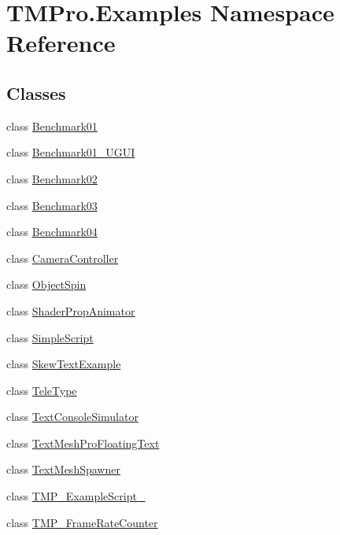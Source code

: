 \hypertarget{namespaceTMPro_1_1Examples}{}\section{T\+M\+Pro.\+Examples Namespace Reference}
\label{namespaceTMPro_1_1Examples}
\subsection*{Classes}
\begin{DoxyCompactItemize}
\item 
class \hyperlink{classTMPro_1_1Examples_1_1Benchmark01}{Benchmark01}
\item 
class \hyperlink{classTMPro_1_1Examples_1_1Benchmark01__UGUI}{Benchmark01\+\_\+\+U\+G\+UI}
\item 
class \hyperlink{classTMPro_1_1Examples_1_1Benchmark02}{Benchmark02}
\item 
class \hyperlink{classTMPro_1_1Examples_1_1Benchmark03}{Benchmark03}
\item 
class \hyperlink{classTMPro_1_1Examples_1_1Benchmark04}{Benchmark04}
\item 
class \hyperlink{classTMPro_1_1Examples_1_1CameraController}{Camera\+Controller}
\item 
class \hyperlink{classTMPro_1_1Examples_1_1ObjectSpin}{Object\+Spin}
\item 
class \hyperlink{classTMPro_1_1Examples_1_1ShaderPropAnimator}{Shader\+Prop\+Animator}
\item 
class \hyperlink{classTMPro_1_1Examples_1_1SimpleScript}{Simple\+Script}
\item 
class \hyperlink{classTMPro_1_1Examples_1_1SkewTextExample}{Skew\+Text\+Example}
\item 
class \hyperlink{classTMPro_1_1Examples_1_1TeleType}{Tele\+Type}
\item 
class \hyperlink{classTMPro_1_1Examples_1_1TextConsoleSimulator}{Text\+Console\+Simulator}
\item 
class \hyperlink{classTMPro_1_1Examples_1_1TextMeshProFloatingText}{Text\+Mesh\+Pro\+Floating\+Text}
\item 
class \hyperlink{classTMPro_1_1Examples_1_1TextMeshSpawner}{Text\+Mesh\+Spawner}
\item 
class \hyperlink{classTMPro_1_1Examples_1_1TMP__ExampleScript__01}{T\+M\+P\+\_\+\+Example\+Script\+\_}
\item 
class \hyperlink{classTMPro_1_1Examples_1_1TMP__FrameRateCounter}{T\+M\+P\+\_\+\+Frame\+Rate\+Counter}

\end{DoxyCompactItemize}
